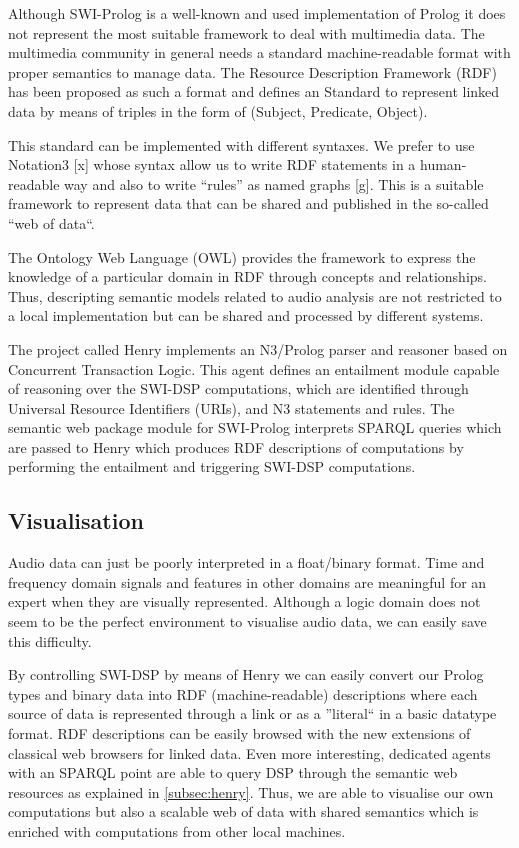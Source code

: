 \documentclass[runningheads]{llncs}
\begin{document}
Although SWI-Prolog is a well-known and used implementation of Prolog it does not represent the most suitable framework to deal with multimedia data. The multimedia community in general needs a standard machine-readable format with proper semantics to manage data. The Resource Description Framework (RDF) has been proposed as such a format and defines an Standard to represent linked data by means of triples in the form of (Subject, Predicate, Object).

This standard can be implemented with different syntaxes. We prefer to use Notation3 [x] whose syntax allow us to write RDF statements in a human-readable way and also to write ``rules'' as named graphs [g]. This is a suitable framework to represent data that can be shared and published in the so-called ``web of data``.

The Ontology Web Language (OWL) provides the framework to express the knowledge of a particular domain in RDF through concepts and relationships. Thus, descripting semantic models related to audio analysis are not restricted to a local implementation but can be shared and processed by different systems.

The project called Henry implements an N3/Prolog parser and reasoner based on Concurrent Transaction Logic. This agent defines an entailment module capable of reasoning over the SWI-DSP computations, which are identified through Universal Resource Identifiers (URIs), and N3 statements and rules. The semantic web package module for SWI-Prolog interprets SPARQL queries which are passed to Henry which produces RDF descriptions of computations by performing the entailment and triggering SWI-DSP computations. 

\subsection{Visualisation}\label{subsec:vis}

Audio data can just be poorly interpreted in a float/binary format. Time and frequency domain signals and features in other domains are meaningful for an expert when they are visually represented. Although a logic domain does not seem to be the perfect environment to visualise audio data, we can easily save this difficulty. 

By controlling SWI-DSP by means of Henry we can easily convert our Prolog types and binary data into RDF (machine-readable) descriptions where each source of data is represented through a link or as a ''literal`` in a basic datatype format. RDF descriptions can be easily browsed with the new extensions of classical web browsers for linked data. Even more interesting, dedicated agents with an SPARQL point are able to query DSP through the semantic web resources as explained in \ref{subsec:henry}. Thus, we are able to visualise our own computations but also a scalable web of data with shared semantics which is enriched with computations from other local machines.
\end{document}
